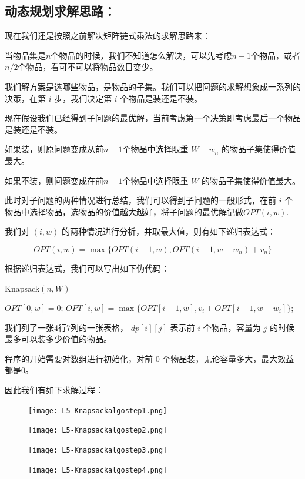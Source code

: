 \subsection{动态规划求解思路：}

现在我们还是按照之前解决矩阵链式乘法的求解思路来：

当物品集是$n$个物品的时候，我们不知道怎么解决，可以先考虑$n-1$个物品，或者$n/2$个物品，看可不可以将物品数目变少。

我们解方案是选哪些物品，是物品的子集。我们可以把问题的求解想象成一系列的决策，在第 $i$ 步，我们决定第 $i$ 个物品是装还是不装。

现在假设我们已经得到子问题的最优解，当前考虑第一个决策即考虑最后一个物品是装还是不装。

如果装，则原问题变成从前$n - 1$个物品中选择限重 $W - w_n$ 的物品子集使得价值最大。

如果不装，则问题变成在前$n - 1$个物品中选择限重 $W$ 的物品子集使得价值最大。

此时对子问题的两种情况进行总结，我们可以得到子问题的一般形式，在前 $i$ 个物品中选择物品，选物品的价值越大越好，将子问题的最优解记做$OPT(i,w)$.

我们对 $(i,w)$ 的两种情况进行分析，并取最大值，则有如下递归表达式：

\[OPT( i, w )=\max\{ OPT(i-1, w), OPT(i-1, w - w_n) + v_n\}\]

根据递归表达式，我们可以写出如下伪代码：

{\sc Knapsack}$(  n, W )$
\begin{algorithmic}[1]
\STATE $OPT[0, w] = 0$;
\ENDFOR
{}
\STATE $OPT[i,w] = \max \{OPT[i-1, w], v_i+OPT[i-1, w-w_i]\}$;
\ENDFOR
\ENDFOR
\end{algorithmic}


我们列了一张4行7列的一张表格， $dp[i][j]$ 表示前 $i$ 个物品，容量为 $j$ 的时候最多可以装多少价值的物品。

程序的开始需要对数组进行初始化，对前 $0$ 个物品装，无论容量多大，最大效益都是0。

因此我们有如下求解过程：

    \begin{figure}
	\texttt{[image: L5-Knapsackalgostep1.png]}
	\end{figure}
	\begin{figure}
	\texttt{[image: L5-Knapsackalgostep2.png]}
	\end{figure}	
	\begin{figure}
	\texttt{[image: L5-Knapsackalgostep3.png]}
	\end{figure}	
	\begin{figure}
	\texttt{[image: L5-Knapsackalgostep4.png]}
	\end{figure}


